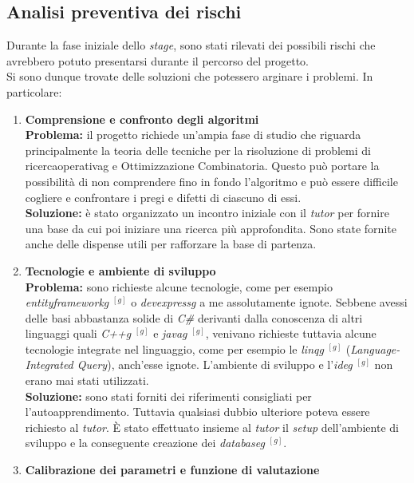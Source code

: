 \subsection{Analisi preventiva dei rischi}
\noindent Durante la fase iniziale dello \textit{stage}, sono stati rilevati dei possibili rischi che avrebbero potuto presentarsi
durante il percorso del progetto.\\
Si sono dunque trovate delle soluzioni che potessero arginare i problemi. In particolare:
\begin{enumerate}
    \item \textbf{Comprensione e confronto degli algoritmi}\\[0.2cm]
    \textbf{Problema:} il progetto richiede un'ampia fase di studio che riguarda principalmente la teoria
    delle tecniche per la risoluzione di problemi di \gls{ricercaoperativag} e Ottimizzazione Combinatoria.
    Questo può portare la possibilità di non comprendere fino in fondo l'algoritmo e può essere difficile cogliere e confrontare
    i pregi e difetti di ciascuno di essi.\\[0.2cm]
    \textbf{Soluzione:} è stato organizzato un incontro iniziale con il \textit{tutor}
    per fornire una base da cui poi iniziare una ricerca più approfondita.
    Sono state fornite anche delle dispense utili per rafforzare la base di partenza.
    \item \textbf{Tecnologie e ambiente di sviluppo}\\[0.2cm]
    \textbf{Problema:} sono richieste alcune tecnologie, come per esempio \textit{\gls{entityframeworkg}} $^{[g]}$ o
    \textit{\gls{devexpressg}} a me assolutamente ignote.
    Sebbene avessi delle basi abbastanza solide di \textit{C\#} derivanti dalla conoscenza di altri linguaggi
    quali \textit{\gls{C++g}} $^{[g]}$ e \textit{\gls{javag}} $^{[g]}$, venivano richieste tuttavia
    alcune tecnologie integrate nel linguaggio, come per esempio le \textit{\gls{linqg}} $^{[g]}$ (\textit{Language-Integrated Query}), anch'esse ignote. L'ambiente di sviluppo e
    l'\textit{\gls{ideg}} $^{[g]}$ non erano mai stati utilizzati.\\[0.2cm]
    \textbf{Soluzione:} sono stati forniti dei riferimenti consigliati per l'autoapprendimento.
    Tuttavia qualsiasi dubbio ulteriore
    poteva essere richiesto al \textit{tutor}. È stato effettuato insieme al \textit{tutor} il \textit{setup} dell'ambiente di sviluppo e la conseguente creazione dei \textit{\gls{databaseg}} $^{[g]}$.
    \item \textbf{Calibrazione dei parametri e funzione di valutazione}\\[0.2cm]

\end{enumerate}
